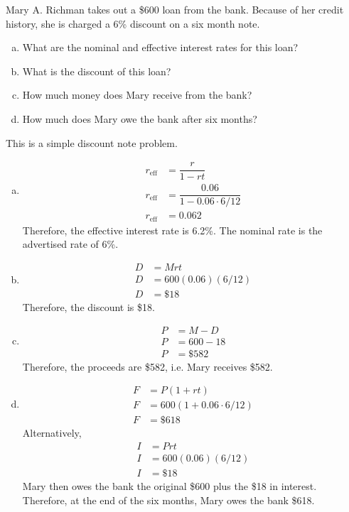 \documentclass[11pt,letterpaper]{article}
\begin{document}
\newpage





 Mary A. Richman takes out a \$600 loan from the bank. Because of her credit history, she is charged a 6\% discount on a six month note. 
\begin{enumerate}[(a)]
\item What are the nominal and effective interest rates for this loan?
\item What is the discount of this loan?
\item How much money does Mary receive from the bank?
\item How much does Mary owe the bank after six months?
\end{enumerate} \pspace

\sol This is a simple discount note problem.
\begin{enumerate}[(a)]
\item 
	\[
	\begin{aligned}
	r_{\text{eff}}&= \dfrac{r}{1 - rt} \\
	r_{\text{eff}}&= \dfrac{0.06}{1 - 0.06 \cdot 6/12} \\
	r_{\text{eff}}&= 0.062
	\end{aligned}
	\]
Therefore, the effective interest rate is 6.2\%. The nominal rate is the advertised rate of 6\%. \pspace

\item 
	\[
	\begin{aligned}
	D&= Mrt \\
	D&= 600(0.06)(6/12) \\
	D&= \$18
	\end{aligned}
	\]
Therefore, the discount is \$18. \pspace

\item 
	\[
	\begin{aligned}
	P&= M - D \\
	P&= 600 - 18 \\
	P&= \$582
	\end{aligned}
	\]
Therefore, the proceeds are \$582, i.e. Mary receives \$582. \pspace

\item 
	\[
	\begin{aligned}
	F&= P(1 + rt) \\
	F&= 600(1 + 0.06 \cdot 6/12) \\
	F&= \$618
	\end{aligned}
	\]
Alternatively, 
	\[
	\begin{aligned}
	I&= Prt \\
	I&= 600(0.06)(6/12) \\
	I&= \$18
	\end{aligned}
	\]
Mary then owes the bank the original \$600 plus the \$18 in interest. Therefore, at the end of the six months, Mary owes the bank \$618. 
\end{enumerate}
\end{document}
